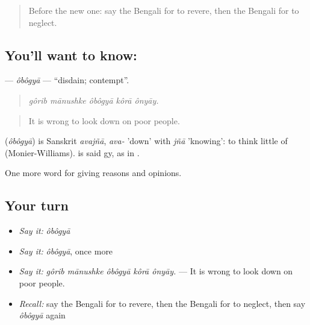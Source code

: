 \label{lesson:BN-C351-obogya}



\begin{quote}
Before the new one: say the Bengali for to revere, then the Bengali for to neglect.
\end{quote}

\subsection*{You'll want to know: }
\textbf{} — \emph{ôbôgyā} — \textquotedblleft{}disdain; contempt\textquotedblright{}.

\begin{quote}
    
\end{quote}

\begin{quote}
\emph{gôrib mānushke ôbôgyā kôrā ônyāy.}
\end{quote}

\begin{quote}
It is wrong to look down on poor people.
\end{quote}

\begin{cousinweb}
\textbf{} (\emph{ôbôgyā}) is Sanskrit \emph{avajñā}, \emph{ava-} 'down' with \emph{jñā} 'knowing': to think little of (Monier-Williams).  is said gy, as in .
\end{cousinweb}

\begin{grammarlens}[title={What you've built}]
One more word for giving reasons and opinions.
\end{grammarlens}

\subsection*{Your turn}
\begin{itemize}
\raggedright
  \item \emph{Say it:} \emph{ôbôgyā}
  \item \emph{Say it:} \emph{ôbôgyā}, once more
  \item \emph{Say it:} \emph{gôrib mānushke ôbôgyā kôrā ônyāy.} — It is wrong to look down on poor people.
  \item \emph{Recall:} say the Bengali for to revere, then the Bengali for to neglect, then say \emph{ôbôgyā} again
\end{itemize}

